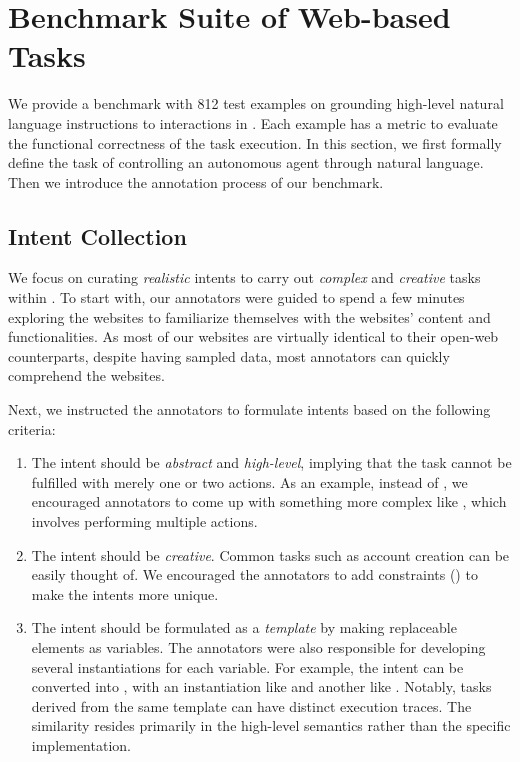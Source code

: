 \section{Benchmark Suite of Web-based Tasks}\label{sec:benchmark}
We provide a benchmark with 812 test examples on grounding high-level natural language instructions to interactions in \ours.
Each example has a metric to evaluate the functional correctness of the task execution. 
In this section, we first formally define the task of controlling an autonomous agent through natural language. Then we introduce the annotation process of our benchmark.

\subsection{Intent Collection}\label{sec:intent_collection}
We focus on curating \emph{realistic} intents to carry out \emph{complex} and \emph{creative} tasks within \ours.
To start with, our annotators were guided to spend a few minutes exploring the websites to familiarize themselves with the websites' content and functionalities. As most of our websites are virtually identical to their open-web counterparts, despite having sampled data, most annotators can quickly comprehend the websites.

Next, we instructed the annotators to formulate intents based on the following criteria:
\begin{enumerate}[label=(\arabic*),leftmargin=20pt,noitemsep]
    \item The intent should be \emph{abstract} and \emph{high-level}, implying that the task cannot be fulfilled with merely one or two actions. As an example, instead of , we encouraged annotators to come up with something more complex like , which involves performing multiple actions.
    \item The intent should be \emph{creative}. Common tasks such as account creation can be easily thought of. We encouraged the annotators to add constraints (\eg {}) to make the intents more unique.
    \item The intent should be formulated as a \emph{template} by making replaceable elements as variables. The annotators were also responsible for developing several instantiations for each variable. For example, the intent  can be converted into , with an instantiation like  and another like . 
    Notably, tasks derived from the same template can have distinct execution traces. The similarity resides primarily in the high-level semantics rather than the specific implementation. %
\end{enumerate}

